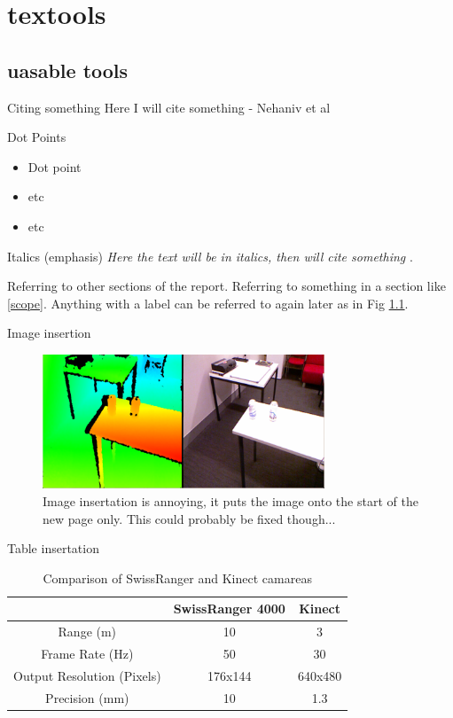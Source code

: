 \documentclass[12pt]{utscapstone}
\renewcommand{\cite}\citep
\begin{document}
\clearpage
{}

\chapter{textools}
\section{uasable tools}
Citing something
Here I will cite something - Nehaniv et al \cite{nehaniv2005} 

Dot Points
\begin{itemize} 
	\item Dot point
	\item etc
	\item etc 
\end{itemize} 

Italics (emphasis)
\emph{Here the text will be in italics, then will cite something} \cite{chawala}.

Referring to other sections of the report.
Referring to something in a section like \ref{scope}.
Anything with a label can be referred to again later as in Fig \ref{fig:rgbanddepth}. 

Image insertion
\begin{figure}[h]
\centering
\includegraphics[width=0.75\textwidth]{figures/rgbanddepth}
\caption[This goes into the contents.]{Image insertation is annoying, it puts the image onto the start of the new page only. This could probably be fixed though...}
\label{fig:rgbanddepth}
\end{figure}

Table insertation
\begin{table}[ht]
\begin{centering}
\begin{tabular}{|c|c|c|}
\hline
 & SwissRanger 4000 & Kinect\\
 \hline
 Range (m) & 10 & 3\\
 \hline
 Frame Rate (Hz) & 50 & 30\\
 \hline
 Output Resolution (Pixels) & 176x144 & 640x480\\
 \hline
 Precision (mm) & 10 & 1.3\\
 \hline 
\end{tabular}
\caption{Comparison of SwissRanger and Kinect camareas}
\label{sensorcomparison}
\end{centering}
\end{table}
\end{document}

